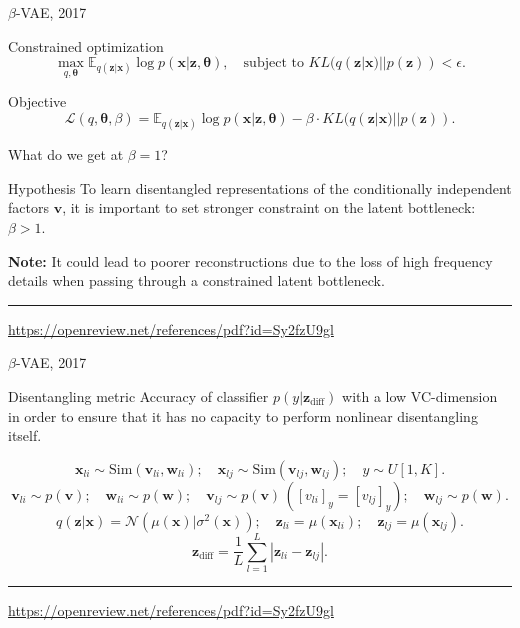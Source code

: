 \documentclass{beamer}
\newcommand{\bv}{\mathbf{v}}
\newcommand{\bw}{\mathbf{w}}
\newcommand{\bx}{\mathbf{x}}
\newcommand{\bz}{\mathbf{z}}
\newcommand{\btheta}{\boldsymbol{\theta}}
\begin{document}
\begin{frame}{$\beta$-VAE, 2017}
\begin{block}{Constrained optimization}
\vspace{-0.5cm}
\[
    \max_{q, \btheta} \mathbb{E}_{q(\bz | \bx)} \log p(\bx | \bz, \btheta), \quad \text{subject to } KL (q(\bz | \bx) || p(\bz)) < \epsilon.
\]
\vspace{-0.5cm}
\end{block}
\begin{block}{Objective}
\vspace{-0.5cm}
\[
    \mathcal{L}(q, \btheta, \beta) = \mathbb{E}_{q(\bz | \bx)} \log p(\bx | \bz, \btheta) - \beta \cdot KL (q(\bz | \bx) || p(\bz)).
\]
\end{block}
What do we get at $\beta = 1$? \\
\begin{block}{Hypothesis}
To learn disentangled representations of the conditionally independent factors $\bv$, it is important to set stronger constraint on the latent bottleneck: $\beta > 1$.
\end{block}
\textbf{Note:} It could lead to poorer reconstructions due to the loss of high frequency details when passing through a constrained latent bottleneck. \\ 
\vspace{0.1cm}
\vfill
\hrule\medskip
{\scriptsize \href{https://openreview.net/references/pdf?id=Sy2fzU9gl}{https://openreview.net/references/pdf?id=Sy2fzU9gl}}
\end{frame}
\begin{frame}{$\beta$-VAE, 2017}
\begin{block}{Disentangling metric}
Accuracy of classifier $p(y | \bz_{\text{diff}})$ with a low VC-dimension in order to ensure that it has no capacity to perform nonlinear disentangling itself.
\end{block}

\[
    \bx_{li} \sim \text{Sim}(\bv_{li}, \bw_{li}); \quad \bx_{lj} \sim \text{Sim}(\bv_{lj}, \bw_{lj}); \quad y \sim U[1, K].
\]
\[
    \bv_{li} \sim p(\bv); \quad \bw_{li} \sim p(\bw); \quad \bv_{lj} \sim p(\bv) \, ([v_{li}]_y = [v_{lj}]_y); \quad \bw_{lj} \sim p(\bw).
\]
\[
    q(\bz | \bx) = \mathcal{N}\left(\mu(\bx) | \sigma^2(\bx)\right); \quad \bz_{li} = \mu(\bx_{li}); \quad \bz_{lj} = \mu(\bx_{lj}).
\]
\[
    \bz_{\text{diff}} = \frac{1}{L} \sum_{l=1}^L | \bz_{li} - \bz_{lj} |.
\]

\vfill
\hrule\medskip
{\scriptsize \href{https://openreview.net/references/pdf?id=Sy2fzU9gl}{https://openreview.net/references/pdf?id=Sy2fzU9gl}}
\end{frame}
\end{document}
